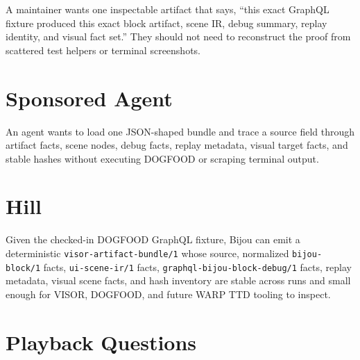 A maintainer wants one inspectable artifact that says, ``this exact GraphQL fixture produced this exact block artifact, scene IR, debug summary, replay identity, and visual fact set.'' They should not need to reconstruct the proof from scattered test helpers or terminal screenshots.

\section{Sponsored Agent}\label{record-145-sponsored-agent}

An agent wants to load one JSON-shaped bundle and trace a source field through artifact facts, scene nodes, debug facts, replay metadata, visual target facts, and stable hashes without executing DOGFOOD or scraping terminal output.

\section{Hill}\label{record-145-hill}

Given the checked-in DOGFOOD GraphQL fixture, Bijou can emit a deterministic \texttt{v\allowbreak{}i\allowbreak{}s\allowbreak{}o\allowbreak{}r\allowbreak{}-\allowbreak{}a\allowbreak{}r\allowbreak{}t\allowbreak{}i\allowbreak{}f\allowbreak{}a\allowbreak{}c\allowbreak{}t\allowbreak{}-\allowbreak{}b\allowbreak{}u\allowbreak{}n\allowbreak{}d\allowbreak{}l\allowbreak{}e\allowbreak{}/\allowbreak{}1} whose source, normalized \texttt{b\allowbreak{}i\allowbreak{}j\allowbreak{}o\allowbreak{}u\allowbreak{}-\allowbreak{}b\allowbreak{}l\allowbreak{}o\allowbreak{}c\allowbreak{}k\allowbreak{}/\allowbreak{}1} facts, \texttt{u\allowbreak{}i\allowbreak{}-\allowbreak{}s\allowbreak{}c\allowbreak{}e\allowbreak{}n\allowbreak{}e\allowbreak{}-\allowbreak{}i\allowbreak{}r\allowbreak{}/\allowbreak{}1} facts, \texttt{g\allowbreak{}r\allowbreak{}a\allowbreak{}p\allowbreak{}h\allowbreak{}q\allowbreak{}l\allowbreak{}-\allowbreak{}b\allowbreak{}i\allowbreak{}j\allowbreak{}o\allowbreak{}u\allowbreak{}-\allowbreak{}b\allowbreak{}l\allowbreak{}o\allowbreak{}c\allowbreak{}k\allowbreak{}-\allowbreak{}d\allowbreak{}e\allowbreak{}b\allowbreak{}u\allowbreak{}g\allowbreak{}/\allowbreak{}1} facts, replay metadata, visual scene facts, and hash inventory are stable across runs and small enough for VISOR, DOGFOOD, and future WARP TTD tooling to inspect.

\section{Playback Questions}\label{record-145-playback-questions}

